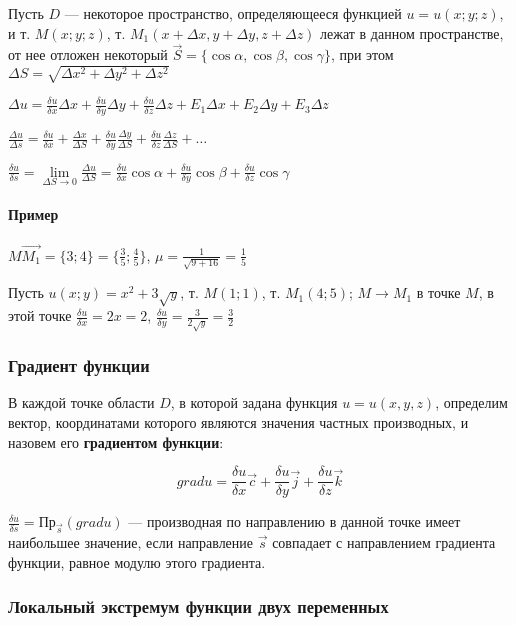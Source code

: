 \documentclass{article}
\begin{document}
\begin{flushleft}
Пусть $D$ — некоторое пространство, определяющееся функцией $u = u(x; y; z)$, и т. $M(x; y; z)$, т. $M_1(x + \Delta x, y + \Delta y, z + \Delta z)$ лежат в данном пространстве, от нее отложен некоторый $\vec{S} = \{ \cos \alpha, \cos \beta, \cos \gamma \}$, при этом $\Delta S = \sqrt{\Delta x^2 + \Delta y^2 + \Delta z^2}$

$\Delta u = \frac{\delta u}{\delta x} \Delta x + \frac{\delta u}{\delta y} \Delta y + \frac{\delta u}{\delta z} \Delta z + E_1 \Delta x + E_2 \Delta y + E_3 \Delta z$

$\frac{\Delta u}{\Delta s} = \frac{\delta u}{\delta x} + \frac{\Delta x}{\Delta S} + \frac{\delta u}{\delta y} \frac{\Delta y}{\Delta S} + \frac{\delta u}{\delta z} \frac{\Delta z}{\Delta S} + \dots$

$\frac{\delta u}{\delta s} = \lim\limits_{\Delta S \to 0} \frac{\Delta u}{\Delta S} = \frac{\delta u}{\delta x} \cos \alpha + \frac{\delta u}{\delta y} \cos \beta + \frac{\delta u}{\delta z} \cos \gamma$

\paragraph{Пример} $M \vec{M_1} = \{ 3; 4 \} = \{\frac{3}{5}; \frac{4}{5} \}$, $\mu = \frac{1}{\sqrt{9 + 16}} = \frac{1}{5}$

Пусть $u(x; y) = x^2 + 3\sqrt{y}$, т. $M(1; 1)$, т. $M_1(4; 5)$; $M \to M_1$ в точке $M$, в этой точке $\frac{\delta u}{\delta x} = 2x = 2$, $\frac{\delta u}{\delta y} = \frac{3}{2\sqrt{y}} = \frac{3}{2}$

\subsubsection{Градиент функции}

В каждой точке области $D$, в которой задана функция $u = u(x, y, z)$, определим вектор, координатами которого являются значения частных производных, и назовем его \textbf{градиентом функции}:

$$grad u = \frac{\delta u}{\delta x} \overrightarrow{c} + \frac{\delta u}{\delta y} \overrightarrow{j} + \frac{\delta u}{\delta z} \overrightarrow{k} $$

$\frac{\delta u}{\delta s} = \text{Пр}_{\overrightarrow{s}} (grad u)$ — производная по направлению в данной точке имеет наибольшее значение, если направление $\overrightarrow{s}$ совпадает с направлением градиента функции, равное модулю этого градиента.

\subsubsection{Локальный экстремум функции двух переменных}


\end{flushleft}
\end{document}
